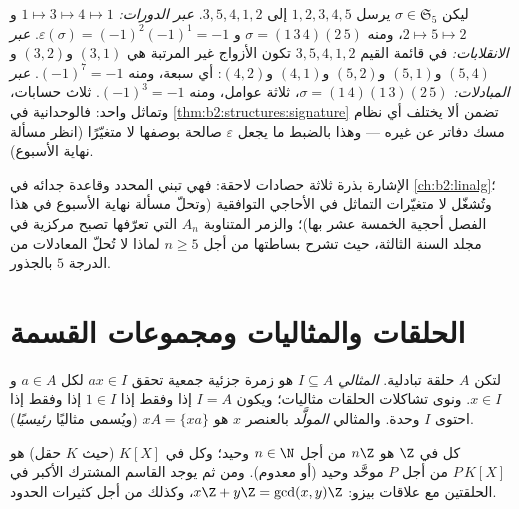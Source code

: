 \begin{example}\label{ex:b2:structures:threeroads}
ليكن $\sigma \in \mathfrak{S}_5$ يرسل $1, 2, 3, 4, 5$ إلى $3, 5, 4,
1, 2$. \emph{عبر الدورات:} $1 \mapsto 3 \mapsto 4 \mapsto 1$ و$2
\mapsto 5 \mapsto 2$، ومنه $\sigma = (1\,3\,4)(2\,5)$ و
$\varepsilon(\sigma) = (-1)^{2}(-1)^{1} = -1$. \emph{عبر
الانقلابات:} في قائمة القيم $3, 5, 4, 1, 2$ تكون الأزواج غير
المرتبة هي $(3,1)$ و$(3,2)$ و$(5,4)$ و$(5,1)$ و$(5,2)$ و$(4,1)$
و$(4,2)$: أي سبعة، ومنه $(-1)^7 = -1$. \emph{عبر
المبادلات:} $\sigma = (1\,4)(1\,3)(2\,5)$، ثلاثة عوامل،
ومنه $(-1)^3 = -1$. ثلاث حسابات، وتماثل واحد: فالوحدانية في
\cref{thm:b2:structures:signature} تضمن ألا يختلف أي نظام مسك دفاتر
عن غيره --- وهذا بالضبط ما يجعل
$\varepsilon$ صالحة بوصفها لا متغيّرًا (انظر مسألة نهاية الأسبوع).
\end{example}

\begin{remark}
الإشارة بذرة ثلاثة حصادات لاحقة: فهي تبني المحدد وقاعدة جدائه في
\cref{ch:b2:linalg}؛ وتُشغّل لا متغيّرات التماثل في الأحاجي
التوافقية (وتحلّ مسألة نهاية الأسبوع في هذا الفصل أحجية الخمسة عشر
بها)؛ والزمر المتناوبة $A_n$ التي تعرّفها تصبح مركزية في مجلد
السنة الثالثة، حيث تشرح بساطتها من أجل $n \geq 5$ لماذا لا تُحلّ
المعادلات من الدرجة $5$ بالجذور.
\end{remark}

\section{الحلقات والمثاليات ومجموعات القسمة}

\begin{definition}[المثالي]\label{def:b2:structures:ideal}
لتكن $A$ حلقة تبادلية. \emph{المثالي} $I
\subseteq A$ هو زمرة
جزئية جمعية تحقق $a x \in I$ لكل
$a \in A$ و$x \in I$. ونوى تشاكلات الحلقات مثاليات؛ ويكون $I = A$
إذا وفقط إذا $1 \in I$ إذا وفقط إذا احتوى $I$ وحدة. والمثالي
\emph{المولَّد} بالعنصر $x$ هو $xA = \{xa\}$ (ويُسمى مثاليًا \emph{رئيسيًا}).
\end{definition}

\begin{theorem}\label{thm:b2:structures:principal}
كل  في $\Z$ هو $n\Z$ من أجل $n \in \N$ وحيد؛ وكل  في
$K[X]$ (حيث $K$ حقل) هو $P\,K[X]$ من أجل $P$ موحَّد وحيد (أو معدوم).
ومن ثم يوجد القاسم المشترك الأكبر في الحلقتين مع علاقات بيزو: $x\Z +
y\Z = \gcd(x,y)\Z$، وكذلك من أجل كثيرات الحدود.
\end{theorem}

